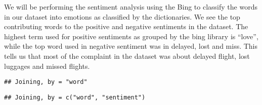 \documentclass[
]{article}
\newenvironment{Shaded}{\begin{snugshade}}{\end{snugshade}}
\newcommand{\CommentTok}[1]{\textcolor[rgb]{0.56,0.35,0.01}{\textit{#1}}}
\newcommand{\DataTypeTok}[1]{\textcolor[rgb]{0.13,0.29,0.53}{#1}}
\newcommand{\DecValTok}[1]{\textcolor[rgb]{0.00,0.00,0.81}{#1}}
\newcommand{\KeywordTok}[1]{\textcolor[rgb]{0.13,0.29,0.53}{\textbf{#1}}}
\newcommand{\NormalTok}[1]{#1}
\newcommand{\OperatorTok}[1]{\textcolor[rgb]{0.81,0.36,0.00}{\textbf{#1}}}
\newcommand{\OtherTok}[1]{\textcolor[rgb]{0.56,0.35,0.01}{#1}}
\newcommand{\StringTok}[1]{\textcolor[rgb]{0.31,0.60,0.02}{#1}}
\begin{document}
We will be performing the sentiment analysis using the Bing to classify
the words in our dataset into emotions as classified by the
dictionaries. We see the top contributing words to the positive and
negative sentiments in the dataset. The highest term used for positive
sentiments as grouped by the bing library is ``love'', while the top
word used in negative sentiment was in delayed, lost and miss. This
tells us that most of the complaint in the dataset was about delayed
flight, lost luggages and missed flights.

\begin{Shaded}
\end{Shaded}

\begin{verbatim}
## Joining, by = "word"
\end{verbatim}

\begin{Shaded}
\end{Shaded}

\begin{verbatim}
## Joining, by = c("word", "sentiment")
\end{verbatim}
\end{document}
